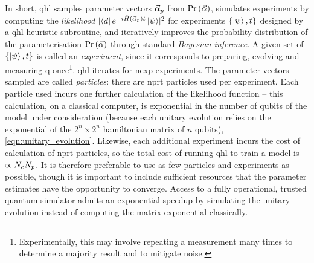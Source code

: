 In short, \gls{qhl} samples parameter vectors $\vec{\alpha}_p$ from $\Pr\left(\vec{\alpha}\right)$, 
    simulates \glspl{experiment} by computing the \emph{likelihood} $\lvert \bra{d} e^{-i \hat{H}(\vec{\alpha}_p)t} \ket{\psi} \rvert^2$
    for \glspl{experiment} $\{\ket{\psi}, t\}$ designed by a \gls{qhl} heuristic subroutine, 
    and iteratively improves the probability distribution of the parameterisation $\Pr\left(\vec{\alpha}\right)$ 
    through standard \emph{Bayesian inference}. 
A given set of $\{\ket{\psi}, t\}$ is called an \emph{experiment}, since it corresponds to preparing, evolving and measuring \gls{q} 
once\footnote{Experimentally, this may involve repeating a measurement many times to determine a majority result and to mitigate noise.}. 
\gls{qhl} iterates for \gls{nexp} \glspl{experiment}. 
The parameter vectors sampled are called \emph{\glspl{particle}}: there are \gls{nprt} \glspl{particle} used per experiment. 
Each \gls{particle} used incurs one further calculation of the \gls{likelihood} function -- 
    this calculation, on a classical computer, is exponential in the number of qubits of the model under consideration
    (because each unitary evolution relies on the exponential of the $2^n \times 2^n$ \gls{hamiltonian} matrix of $n$ qubits), 
    \cref{eqn:unitary_evolution}. 
Likewise, each additional \gls{experiment} incurs the cost of calculation of \gls{nprt} \glspl{particle}, 
    so the total cost of running \gls{qhl} to train a model is $\propto N_e N_p$.
It is therefore preferable to use as few \glspl{particle} and \glspl{experiment} as possible, 
    though it is important to include sufficient resources that the parameter estimates have the opportunity to converge. 
Access to a fully operational, trusted quantum simulator admits an exponential 
    speedup by simulating the unitary evolution instead of computing the matrix exponential classically.
\par 

